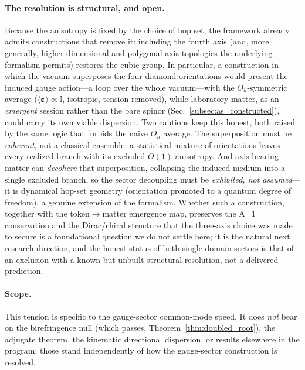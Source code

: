 \paragraph{The resolution is structural, and open.} Because the anisotropy is fixed by the
choice of hop set, the framework already admits constructions that remove it: including the
fourth axis (and, more generally, higher-dimensional and polygonal axis topologies the
underlying formalism permits) restores the cubic group. In particular, a construction in
which the vacuum superposes the four diamond orientations would present the induced gauge
action---a loop over the whole vacuum---with the $O_h$-symmetric average
($\langle\boldsymbol{\varepsilon}\rangle\propto\mathbb{I}$, isotropic, tension removed),
while laboratory matter, as an \emph{emergent} session rather than the bare spinor
(Sec.~\ref{subsec:as_constructed}), could carry its own viable dispersion. Two cautions
keep this honest, both raised by the same logic that forbids the naive $O_h$ average. The
superposition must be \emph{coherent}, not a classical ensemble: a statistical mixture of
orientations leaves every realized branch with its excluded $O(1)$ anisotropy. And
axis-bearing matter can \emph{decohere} that superposition, collapsing the induced medium
into a single excluded branch, so the sector decoupling must be \emph{exhibited, not
assumed}---it is dynamical hop-set geometry (orientation promoted to a quantum degree of
freedom), a genuine extension of the formalism. Whether such a construction, together with
the token$\to$matter emergence map, preserves the A=1 conservation and the Dirac/chiral
structure that the three-axis choice was made to secure is a foundational question we do
not settle here; it is the natural next research direction, and the honest status of both
single-domain sectors is that of an exclusion with a known-but-unbuilt structural
resolution, not a delivered prediction.

\paragraph{Scope.} This tension is specific to the gauge-sector common-mode speed. It does
\emph{not} bear on the birefringence null (which passes, Theorem~\ref{thm:doubled_root}),
the adjugate theorem, the kinematic directional dispersion, or results elsewhere in the
program; those stand independently of how the gauge-sector construction is resolved.

